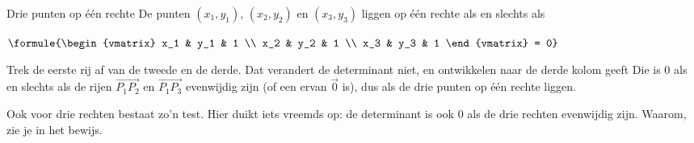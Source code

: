 \begin{theorie}
\begin{stelling}{Drie punten op één rechte}
De punten $(x_1, y_1)$, $(x_2, y_2)$ en $(x_3, y_3)$ liggen op één rechte als en slechts als

\vspace{1mm}
\qquad $\formule{\begin{vmatrix} x_1 & y_1 & 1 \\ x_2 & y_2 & 1 \\ x_3 & y_3 & 1 \end{vmatrix} = 0}$
\end{stelling}

\begin{bewijs}
Trek de eerste rij af van de tweede en de derde. Dat verandert de determinant niet, en ontwikkelen naar de derde kolom geeft
Die is 0 als en slechts als de rijen $\vec{P_1P_2}$ en $\vec{P_1P_3}$ evenwijdig zijn (of een ervan $\vec 0$ is), dus als de drie punten op één rechte liggen.
\end{bewijs}
\end{theorie}

Ook voor drie rechten bestaat zo'n test. Hier duikt iets vreemds op: de determinant is ook 0 als de drie rechten evenwijdig zijn. Waarom, zie je in het bewijs.

